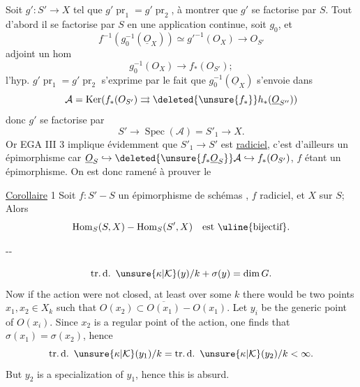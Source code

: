 Soit $g':S'\longrightarrow X$ tel que $g'\operatorname{pr}_1=g'\operatorname{pr}_2$, à montrer que $g'$ se factorise par $S$. Tout d'abord il se factorise par $S$ en  une application continue, soit $g_0$, et
\[
f^{-1}(g_0^{-1}(\underline O_X))\simeq g'^{-1}(O_X)\longrightarrow O_{S'}
\]
adjoint un hom
\[
g_0^{-1}(O_X)\longrightarrow f_*(O_{S'});
\]
l'hyp. $g'\operatorname{pr}_1=g'\operatorname{pr}_2$ s'exprime par le fait que $g_0^{-1}(\underline O_X)$ s'envoie dans
\[
\mathcal A=\operatorname{Ker}(f_*(O_{S'})\rightrightarrows\deleted{\unsure{f_*}}h_*(\underline O_{S''}))
\]
donc $g'$ se factorise par
\[
S'\longrightarrow\operatorname{Spec}(\mathcal A)=S'_1\longrightarrow X.
\]
Or EGA III 3 implique évidemment que $S'_1\longrightarrow S'$ est  \uline{radiciel}, c'est d'ailleurs un épimorphisme car $\underline O_S\hookrightarrow\deleted{\unsure{f_*\underline O_S}}\mathcal A\hookrightarrow f_*(O_{S'})$, $f$ étant un épimorphisme. On est donc ramené à prouver le

\uline{Corollaire} 1 Soit $f:S'\mathbin{-}S$ un épimorphisme de schémas , $f$   radiciel, et $X$   sur $S$;   Alors
\[
\operatorname{Hom}_S(S,X)\mathbin{-}\operatorname{Hom}_S(S',X)\quad\text{est \uline{bijectif}}.
\]

\begin{center}--\end{center}
\[
\operatorname{tr.d.}\ \unsure{\kappa|\mathcal K}(y)/k+\sigma(y)=\dim G.
\]
Now if the action were not closed, at least over some $k$ there would be two points $x_1,x_2\in X_k$ such that $O(x_2)\subset\overline{O(x_1)}-O(x_1)$. Let $y_i$ be the generic point of $O(x_i)$. Since $x_2$ is a regular point of the action, one finds that $\sigma(x_1)=\sigma(x_2)$, hence
\[
\operatorname{tr.d.}\ \unsure{\kappa|\mathcal K}(y_1)/k=\operatorname{tr.d.}\ \unsure{\kappa|\mathcal K}(y_2)/k<\infty.
\]
But $y_2$ is a specialization of $y_1$, hence this is absurd.


